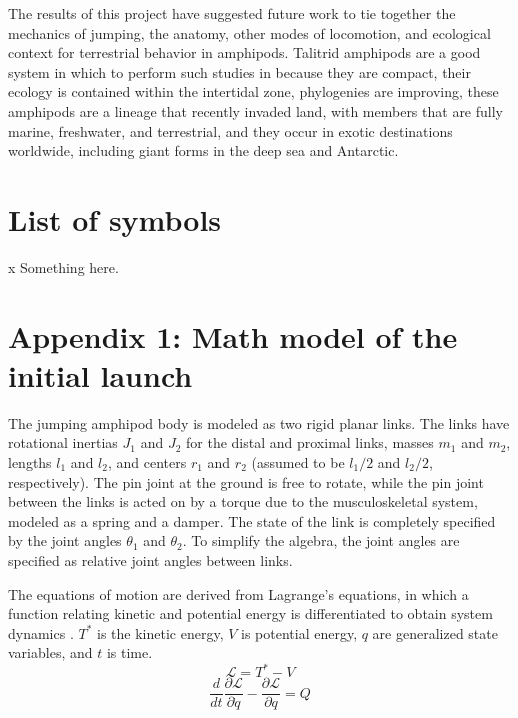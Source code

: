 \documentclass{jeb}
\begin{document}
The results of this project have suggested future work to tie together the mechanics of jumping, the anatomy, other modes of locomotion, and ecological context for terrestrial behavior in amphipods.  Talitrid amphipods are a good system in which to perform such studies in because they are compact, their ecology is contained within the intertidal zone, phylogenies are improving, these amphipods are a lineage that recently invaded land, with members that are fully marine, freshwater, and terrestrial, and they occur in exotic destinations worldwide, including giant forms in the deep sea and Antarctic.    

\section{List of symbols}
\begin{jebsymbolslist}
\item[x] Something here.
\end{jebsymbolslist}

\section{Appendix 1: Math model of the initial launch}
\label{app:1}
	The jumping amphipod body is modeled as two rigid planar links.  The links have rotational inertias $J_1$ and $J_2$ for the distal and proximal links, masses $m_1$ and $m_2$, lengths $l_1$ and $l_2$, and centers $r_1$ and $r_2$ (assumed to be $l_1/2$ and $l_2/2$, respectively).  The pin joint at the ground is free to rotate, while the pin joint between the links is acted on by a torque due to the musculoskeletal system, modeled as a spring and a damper.  The state of the link is completely specified by the joint angles $\theta_1$ and $\theta_2$.  To simplify the algebra, the joint angles are specified as relative joint angles between links.  

	The equations of motion are derived from Lagrange's equations, in which a function relating kinetic and potential energy is differentiated to obtain system dynamics \citep{Baruh:2007}.  $T^*$ is the kinetic energy, $V$ is potential energy, $q$ are generalized state variables, and $t$ is time. 
\begin{equation}
\mathcal{L} = T^* - V
\end{equation}
\begin{equation}
\frac{d}{dt}\frac{\partial \mathcal{L}}{\partial \dot{q}}
-
\frac{\partial \mathcal{L}}{\partial q}
=
Q
\end{equation}
\end{document}
